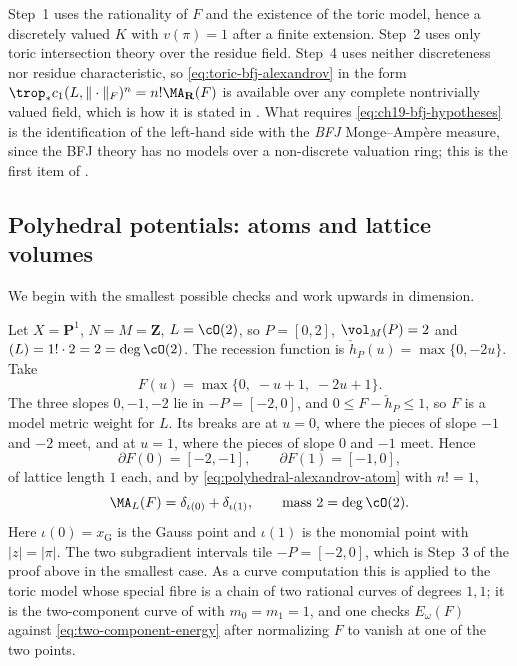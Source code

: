 \begin{remark}
\label{rem:ch31-toric-hypotheses}
Step~1 uses the rationality of \(F\) and the existence of the toric model,
hence a discretely valued \(K\) with \(v(\pi)=1\) after a finite extension.
Step~2 uses only toric intersection theory over the residue field.  Step~4
uses neither discreteness nor residue characteristic, so
\eqref{eq:toric-bfj-alexandrov} in the form
\(\trop_*c_1(L,\|\cdot\|_F)^n=n!\MA_{\mathbf R}(F)\) is available over any
complete nontrivially valued field, which is how it is stated in
.  What requires \eqref{eq:ch19-bfj-hypotheses} is
the identification of the left-hand side with the \emph{BFJ}
Monge--Amp\`ere measure, since the BFJ theory has no models over a
non-discrete valuation ring; this is the first item of
.
\end{remark}

\subsection{Polyhedral potentials: atoms and lattice volumes}
\label{sec:ch31-toric-polyhedral}

We begin with the smallest possible checks and work upwards in dimension.

\begin{example}
\label{ex:ch31-toric-p1-two-atoms}
Let \(X=\mathbf P^1\), \(N=M=\mathbf Z\), \(L=\cO(2)\), so
\(P=[0,2]\), \(\vol_M(P)=2\) and \((L)=1!\cdot2=2=\deg\cO(2)\).  The
recession function is \(\check h_P(u)=\max\{0,-2u\}\).  Take
\[
 F(u)=\max\{0,\;-u+1,\;-2u+1\}.
\]
The three slopes \(0,-1,-2\) lie in \(-P=[-2,0]\), and
\(0\leq F-\check h_P\leq1\), so \(F\) is a model metric weight for \(L\).
Its breaks are at \(u=0\), where the pieces of slope \(-1\) and \(-2\)
meet, and at \(u=1\), where the pieces of slope \(0\) and \(-1\) meet.
Hence
\[
 \partial F(0)=[-2,-1],\qquad \partial F(1)=[-1,0],
\]
of lattice length \(1\) each, and by
\eqref{eq:polyhedral-alexandrov-atom} with \(n!=1\),
\[
 \MA_L(F)=\delta_{\iota(0)}+\delta_{\iota(1)},
 \qquad\text{mass }2=\deg\cO(2).
\]
Here \(\iota(0)=x_{\mathrm G}\) is the Gauss point and \(\iota(1)\) is the
monomial point with \(|z|=|\pi|\).  The two subgradient intervals tile
\(-P=[-2,0]\), which is Step~3 of the proof above in the smallest case.
As a curve computation this is  applied to
the toric model whose special fibre is a chain of two rational curves of
degrees \(1,1\); it is the two-component curve of
 with \(m_0=m_1=1\), and one checks
\(E_\omega(F)\) against \eqref{eq:two-component-energy} after normalizing
\(F\) to vanish at one of the two points.
\end{example}

